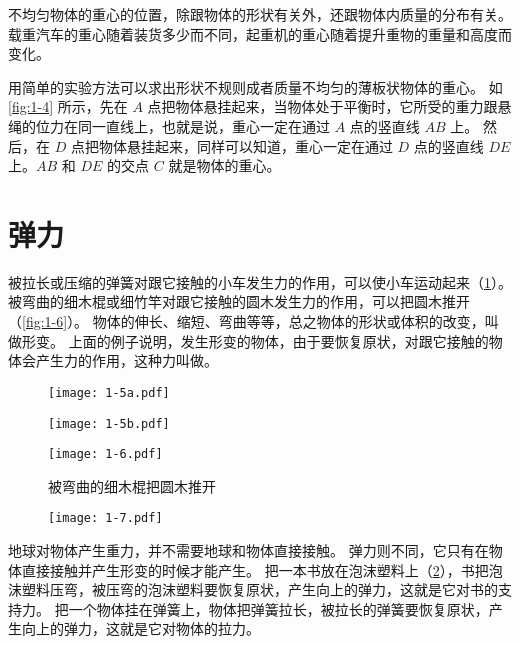 不均匀物体的重心的位置，除跟物体的形状有关外，还跟物体内质量的分布有关。
载重汽车的重心随着装货多少而不同，起重机的重心随着提升重物的重量和高度而变化。

用简单的实验方法可以求出形状不规则成者质量不均匀的薄板状物体的重心。
如\cref{fig:1-4} 所示，先在 $A$ 点把物体悬挂起来，当物体处于平衡时，它所受的重力跟悬绳的位力在同一直线上，也就是说，重心一定在通过 $A$ 点的竖直线 $AB$ 上。
然后，在 $D$ 点把物体悬挂起来，同样可以知道，重心一定在通过 $D$ 点的竖直线 $DE$ 上。$AB$ 和 $DE$ 的交点 $C$ 就是物体的重心。

\section{弹力}
被拉长或压缩的弹簧对跟它接触的小车发生力的作用，可以使小车运动起来（\cref{fig:1-5}）。
被弯曲的细木棍或细竹竿对跟它接触的圆木发生力的作用，可以把圆木推开（\cref{fig:1-6}）。
物体的伸长、缩短、弯曲等等，总之物体的形状或体积的改变，叫做形变。
上面的例子说明，发生形变的物体，由于要恢复原状，对跟它接触的物体会产生力的作用，这种力叫做。

\begin{figure}
  \begin{minipage}{0.48\linewidth}\centering
    \texttt{[image: 1-5a.pdf]}
  \end{minipage}
  \begin{minipage}{0.48\linewidth}\centering
    \texttt{[image: 1-5b.pdf]}
  \end{minipage}
  \caption{}\label{fig:1-5}
\end{figure}

\begin{figure}
  \begin{minipage}[b]{0.58\linewidth}\centering
    \texttt{[image: 1-6.pdf]}
    \caption{被弯曲的细木棍把圆木推开}\label{fig:1-6}
  \end{minipage}
  \begin{minipage}[b]{0.38\linewidth}\centering
    \texttt{[image: 1-7.pdf]}
    \caption{}\label{fig:1-7}
  \end{minipage}
\end{figure}

地球对物体产生重力，并不需要地球和物体直接接触。
弹力则不同，它只有在物体直接接触并产生形变的时候才能产生。
把一本书放在泡沫塑料上（\cref{fig:1-7}），书把泡沫塑料压弯，被压弯的泡沫塑料要恢复原状，产生向上的弹力，这就是它对书的支持力。
把一个物体挂在弹簧上，物体把弹簧拉长，被拉长的弹簧要恢复原状，产生向上的弹力，这就是它对物体的拉力。

